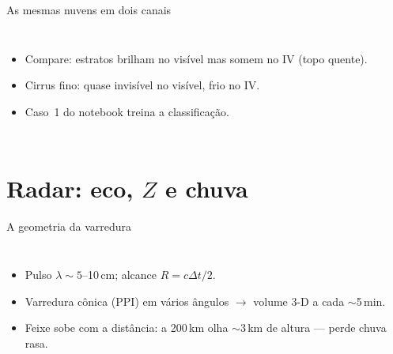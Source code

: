 \documentclass[aspectratio=169,11pt]{beamer}
\begin{document}
\begin{frame}{As mesmas nuvens em dois canais}
  \begin{columns}
    \begin{itemize}
      \item Compare: estratos brilham no visível mas somem no IV
            (topo quente).
      \item Cirrus fino: quase invisível no visível, frio no IV.
      \item Caso~1 do notebook treina a classificação.
    \end{itemize}
  \end{columns}
\end{frame}

\section{Radar: eco, $Z$ e chuva}

\begin{frame}{A geometria da varredura}
  \begin{columns}
    \begin{itemize}
      \item Pulso $\lambda\sim5$--10\,cm; alcance $R = c\Delta t/2$.
      \item Varredura cônica (PPI) em vários ângulos $\to$ volume 3-D
            a cada $\sim$5\,min.
      \item Feixe sobe com a distância: a 200\,km olha $\sim$3\,km de
            altura — perde chuva rasa.
    \end{itemize}
  \end{columns}
\end{frame}
\end{document}
